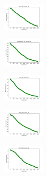 \begin{figure}[H]
    \begin{subfigure}
        \centering
        \includegraphics[width=0.234\textwidth]{img/agesf/rand_set_const_20_277451237_cost.png}
    \end{subfigure}
    \hfill
    \begin{subfigure}
        \centering
        \includegraphics[width=0.234\textwidth]{img/agesf/newthyroid_set_const_20_277451237_cost.png}
    \end{subfigure}
    \hfill
    \begin{subfigure}
        \centering
        \includegraphics[width=0.234\textwidth]{img/agesf/iris_set_const_20_49258669_cost.png}
    \end{subfigure}
    \hfill
    \begin{subfigure}
        \centering
        \includegraphics[width=0.234\textwidth]{img/agesf/ecoli_set_const_20_49258669_cost.png}
    \end{subfigure}
    \hfill
    \begin{subfigure}
        \centering
        \includegraphics[width=0.234\textwidth]{img/agesf/rand_set_const_20_49258669_cost.png}
    \end{subfigure}
    \hfill
    \begin{subfigure}
        \centering

\end{subfigure}
\end{figure}
